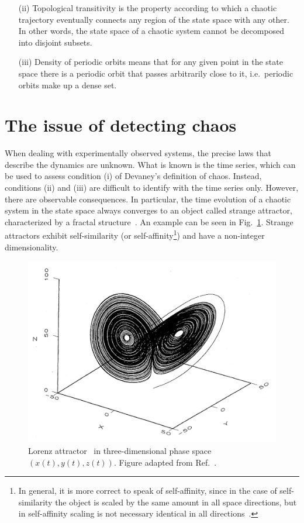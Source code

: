 \begin{itemize}
    \item[(ii)] Topological transitivity is the property according to which a chaotic trajectory eventually connects
    any region of the state space with any other. In other words, the state space of a chaotic system
    cannot be decomposed into disjoint subsets.

    \item[(iii)] Density of periodic orbits means that for any given point in the state space
    there is a periodic orbit that passes arbitrarily close to it, i.e.\ periodic orbits make up a dense set.

\end{itemize}


\section{The issue of detecting chaos}\label{sec: chaos in experiments}

When dealing with experimentally observed systems, the precise laws that describe the dynamics are unknown.
What is known is the time series, which can be used to assess condition (i) of Devaney's definition
of chaos. Instead, conditions (ii) and (iii) are difficult to identify with the time series only.
However, there are observable consequences. In particular, the time
evolution of a chaotic system in the state space always converges to an object called strange
attractor, characterized by a fractal structure~\cite{ref:fractal_dim,ref:fractal_book}.
An example can be seen in Fig.~\ref{fig: lorenz attractor}. Strange
attractors exhibit self-similarity (or self-affinity\footnote{In general, it is more correct to speak
of self-affinity, since in the case of self-similarity the
object is scaled by the same amount in all space directions, but in self-affinity scaling is not
necessary identical in all directions~\cite{ref:mandelbrot_fractal}.}) and have a non-integer dimensionality.

\begin{figure}[!htbp]
\centering
\includegraphics[width=.6\linewidth]{images/lorenz_attractor.png}
\caption{
    Lorenz attractor~\cite{lorenz1963deterministic} in three-dimensional phase space
    $(x(t),y(t),z(t))$. Figure adapted from Ref.~\cite{ref:abarbanel_fourier_spectra}.
}\label{fig: lorenz attractor}
\end{figure}


